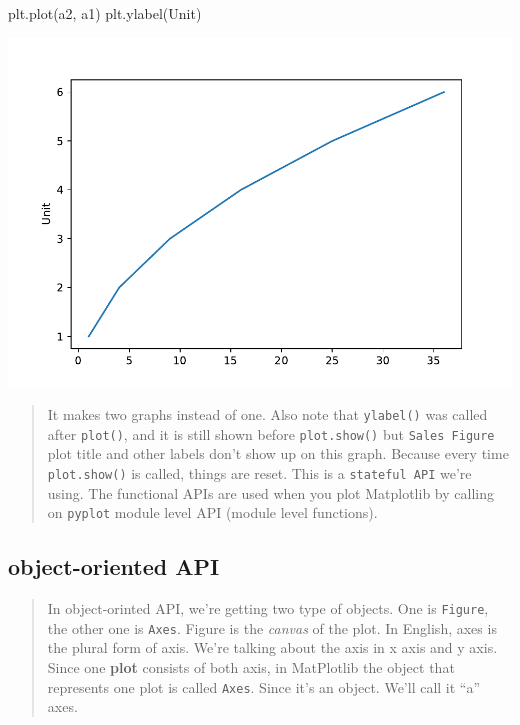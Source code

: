 \documentclass[
]{book}
\newenvironment{Shaded}{\begin{snugshade}}{\end{snugshade}}
\newcommand{\NormalTok}[1]{#1}
\newcommand{\StringTok}[1]{\textcolor[rgb]{0.31,0.60,0.02}{#1}}
\theoremstyle{definition}
\theoremstyle{definition}
\theoremstyle{definition}
\theoremstyle{definition}
\theoremstyle{remark}
\begin{document}
\begin{Shaded}
\begin{Highlighting}[]
\NormalTok{plt.plot(a2, a1)}
\NormalTok{plt.ylabel(}\StringTok{\textquotesingle{}Unit\textquotesingle{}}\NormalTok{)}
\end{Highlighting}
\end{Shaded}

\includegraphics{202403181222-MatPlotLib_files/figure-latex/unnamed-chunk-10-9.pdf}

\begin{quote}
It makes two graphs instead of one. Also note that \texttt{ylabel()} was called after \texttt{plot()}, and it is still shown before \texttt{plot.show()} but \texttt{Sales\ Figure} plot title and other labels don't show up on this graph. Because every time \texttt{plot.show()} is called, things are reset. This is a \texttt{stateful\ API} we're using.
The functional APIs are used when you plot Matplotlib by calling on \texttt{pyplot} module level API (module level functions).
\end{quote}

\hypertarget{ooapi}{%
\subsection{object-oriented API}\label{ooapi}}

\begin{quote}
In object-orinted API, we're getting two type of objects. One is \texttt{Figure}, the other one is \texttt{Axes}. Figure is the \emph{canvas} of the plot. In English, axes is the plural form of axis. We're talking about the axis in x axis and y axis. Since one \textbf{plot} consists of both axis, in MatPlotlib the object that represents one plot is called \texttt{Axes}. Since it's an object. We'll call it ``a'' axes.
\end{quote}
\end{document}
